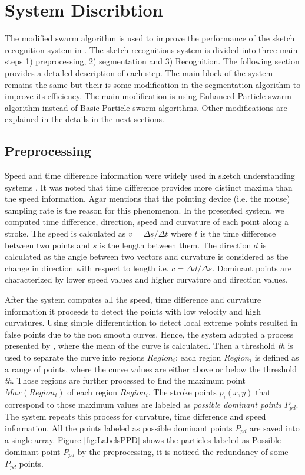 \documentclass[10pt]{article}
\begin{document}
\section{System Discribtion  }\label{Sysdisc}
The modified swarm algorithm is used to improve the performance of the sketch recognition system in \cite{mypaper}. The sketch recognitions system is divided into three main steps 1) preprocessing, 2) segmentation and 3) Recognition. The following section provides a detailed description of each step. The main block of the system remains the same but their is some modification in the segmentation algorithm to improve its efficiency. The main modification is using Enhanced Particle swarm algorithm instead of Basic Particle swarm algorithms. Other modifications are explained in the details in the next sections.  
\subsection{Preprocessing}
\label{Prepross}
 Speed and time difference information were widely used in sketch understanding systems \cite{earlyprocess}. It was noted that time difference provides more distinct maxima than the speed information. Agar \cite{polygonfeedback31} mentions that the pointing device (i.e. the mouse) sampling rate is the reason for this phenomenon. 
 In the presented system, we computed time difference, direction, speed and curvature of each point along a stroke. The speed is calculated as $v=\Delta s/\Delta t$ where $t$ is the time difference between two points and $s$ is the length between them. The direction $d$ is calculated as the angle between two vectors and curvature is considered as the change in direction with respect to length i.e. $c= \Delta d/\Delta s$. Dominant points are characterized by lower speed values and higher curvature and direction values.
  
After the system computes all the speed, time difference and curvature information it proceeds to detect the points with low velocity and high curvatures. Using simple differentiation to detect local extreme points resulted in false points due to the non smooth curves. Hence, the system adopted a process presented by \cite{earlyprocess}, where the mean of the curve is calculated. Then a threshold \textit{th} is used to separate the curve into regions $Region_i$; each region $Region_i$ is defined as a range of points, where the curve values are either above or below the threshold \textit{th}. Those regions are further processed to find the maximum point $Max(Region_i)$ of each region $Region_i$. The stroke points $p_i(x,y)$ that correspond to those maximum values are labeled as \textit{possible dominant points} $P_{pd}$. The system repeats this process for curvature, time difference and speed information. All the points labeled as possible dominant points $P_{pd}$ are saved into a single array. Figure \ref{fig:LabelsPPD} shows the particles labeled as Possible dominant point $P_{pd}$ by the preprocessing, it is noticed the redundancy of some $P_{pd}$ points. %
\end{document}
